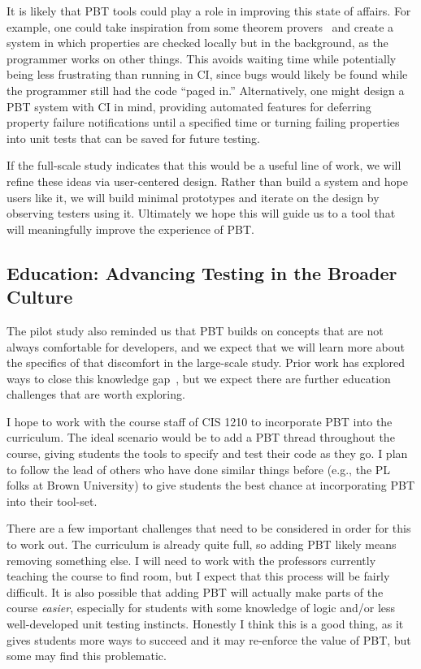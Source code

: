 It is likely that PBT tools could play a role in improving this state of
affairs. For example, one could take inspiration from some theorem
provers~\cite{berghofer2004random} and create a system in which properties are
checked locally but in the background, as the programmer works on other things.
This avoids waiting time while potentially being less frustrating than running
in CI, since bugs would likely be found while the programmer still had the code
``paged in.'' Alternatively, one might design a PBT system with CI in mind,
providing automated features for deferring property failure notifications until
a specified time or turning failing properties into unit tests that can be saved
for future testing.

If the full-scale study indicates that this would be a useful line of work, we
will refine these ideas via user-centered design. Rather than build a system and
hope users like it, we will build minimal prototypes and iterate on the design
by observing testers using it. Ultimately we hope this will guide us to a tool
that will meaningfully improve the experience of PBT.

\subsection{Education: Advancing Testing in the Broader Culture }\label{sec:ed}

The pilot study also reminded us that PBT builds on concepts that are not
always comfortable for developers, and we expect that we will learn more about
the specifics of that discomfort in the large-scale study.  Prior work has
explored ways to close this knowledge
gap~\cite{wrenn2021using,nelson2021automated}, but we expect there are further
education challenges that are worth exploring.

I hope to work with the course staff of CIS 1210 to incorporate PBT into the
curriculum. The ideal scenario would be to add a PBT thread throughout the
course, giving students the tools to specify and test their code as they go.  I
plan to follow the lead of others who have done similar things before (e.g., the
PL folks at Brown University) to give students the best chance at incorporating
PBT into their tool-set.

There are a few important challenges that need to be considered in order for
this to work out.  The curriculum is already quite full, so adding PBT likely
means removing something else. I will need to work with the professors currently
teaching the course to find room, but I expect that this process will be fairly
difficult. It is also possible that adding PBT will actually make parts of the
course {\em easier}, especially for students with some knowledge of logic and/or
less well-developed unit testing instincts. Honestly I think this is a good
thing, as it gives students more ways to succeed and it may re-enforce the value
of PBT, but some may find this problematic.

